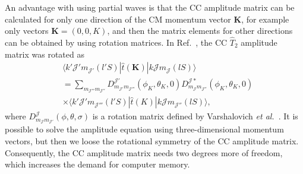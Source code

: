 \documentclass[a4paper,12pt]{report}
\begin{document}
An advantage with using partial waves is that the CC amplitude matrix can be calculated for only one direction of the CM momentum vector $\mathbf{K}$, for example only vectors $\mathbf{K} = (0, 0, K)$, and then the matrix elements for other directions can be obtained by using rotation matrices. In Ref.~\cite{baardsen}, the CC $\hat{T}_{2}$ amplitude matrix was rotated as 
\begin{align} 
  &\langle k'\mathcal{J}'m_{\mathcal{J}'}(l'S)|\hat{t}(\mathbf{K})|k\mathcal{J}m_{\mathcal{J}}(lS)\rangle \nonumber \\
  &= \sum_{m_{\mathcal{J}'''}m_{\mathcal{J}''}}D_{m_{\mathcal{J}'}m_{\mathcal{J}'''}}^{\mathcal{J}'}(\phi_{K},\theta_{K},0)D_{m_{\mathcal{J}}m_{\mathcal{J}''}}^{\mathcal{J} *}(\phi_{K},\theta_{K},0) \nonumber \\
  &\times \langle k'\mathcal{J}'m_{\mathcal{J}'''}(l'S)|\hat{t}(K)|k\mathcal{J}m_{\mathcal{J}''}(lS)\rangle , 
  \label{eq:rotation}
\end{align}
where $D_{m_{\mathcal{J}}m_{\mathcal{J}'}}^{\mathcal{J}}(\phi ,\theta ,\sigma )$ is a rotation matrix defined by Varshalovich \emph{et al.}~\cite{varshalovich}. It is possible to solve the amplitude equation using three-dimensional momentum vectors, but then we loose the rotational symmetry of the CC amplitude matrix. Consequently, the CC amplitude matrix needs two degrees more of freedom, which increases the demand for computer memory. 




\end{document}
